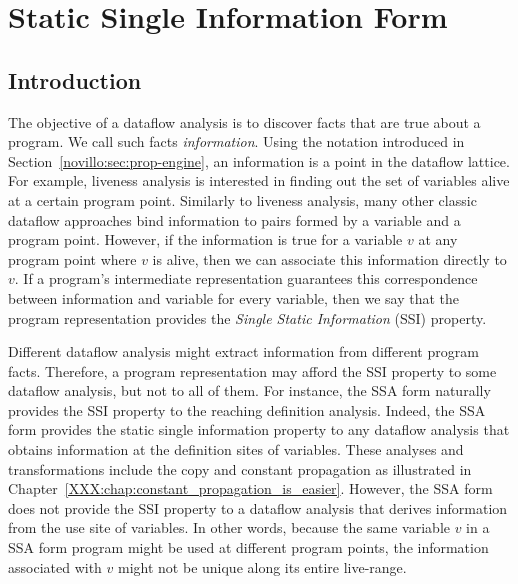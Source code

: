 \chapter{Static Single Information Form }
\label{chap:ssi}

\graphicspath{{img/}{ssi/img/}{part2/ssi/img/}}

\section{Introduction}
\label{sec:ssi:pereira:intro}

The objective of a dataflow analysis is to discover facts that are true about a
program.
We call such facts {\em information}.
Using the notation introduced in Section~\ref{novillo:sec:prop-engine}, an
information is a point in the dataflow lattice.
For example, liveness analysis is interested in finding out the set of
variables alive at a certain program point.
Similarly to liveness analysis, many other classic dataflow approaches bind
information to pairs formed by a variable and a program point.
However, if the information is true for a variable $v$ at any program point where
$v$ is alive, then we can associate this information directly to $v$.
If a program's intermediate representation guarantees this correspondence between
information and variable for every variable, then we say that the program
representation provides the {\em Single Static Information} (SSI) property.

Different dataflow analysis might extract information from different program
facts.
Therefore, a program representation may afford the SSI property to some dataflow
analysis, but not to all of them.
For instance, the SSA form naturally provides the SSI property to the reaching
definition analysis.
Indeed, the SSA form provides the static single information property to any
dataflow analysis that obtains information at the definition sites of
variables.
These analyses and transformations include the copy and constant propagation as illustrated in Chapter~\ref{XXX:chap:constant_propagation_is_easier}.
However, the SSA form does not provide the SSI property to a dataflow analysis
that derives information from the use site of variables.
In other words, because the same variable $v$ in a SSA form program might be used
at different program points, the information associated with $v$ might not be
unique along its entire live-range.

